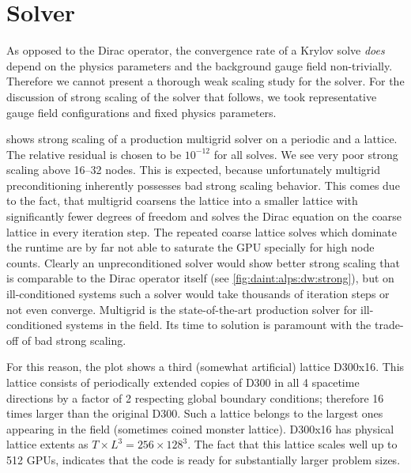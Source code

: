 
\section{Solver}
\label{sec:perf:solver}

As opposed to the Dirac operator, the convergence rate of a Krylov solve \emph{does} depend on the physics parameters and the background gauge field non-trivially.
Therefore we cannot present a thorough weak scaling study for the solver.
For the discussion of strong scaling of the solver that follows, we took representative gauge field configurations and fixed physics parameters.

 shows strong scaling of a production multigrid solver on a periodic and a \Cstar lattice.
The relative residual is chosen to be $10^{-12}$ for all solves.
We see very poor strong scaling above \numrange{16}{32} nodes.
This is expected, because unfortunately multigrid preconditioning inherently possesses bad strong scaling behavior.
This comes due to the fact, that multigrid coarsens the lattice into a smaller lattice with significantly fewer degrees of freedom and solves the Dirac equation on the coarse lattice in every iteration step.
The repeated coarse lattice solves which dominate the runtime are by far not able to saturate the GPU specially for high node counts.
Clearly an unpreconditioned solver would show better strong scaling that is comparable to the Dirac operator itself (see \cref{fig:daint:alps:dw:strong}), but on ill-conditioned systems such a solver would take thousands of iteration steps or not even converge.
Multigrid is the state-of-the-art production solver for ill-conditioned systems in the field.
Its time to solution is paramount with the trade-off of bad strong scaling.

For this reason, the plot shows a third (somewhat artificial) lattice D300x16.
This lattice consists of periodically extended copies of D300 in all \num{4} spacetime directions by a factor of \num{2} respecting global boundary conditions; therefore \num{16} times larger than the original D300.
Such a lattice belongs to the largest ones appearing in the field (sometimes coined monster lattice).
D300x16 has physical lattice extents as $T \times L^{3} = 256 \times 128^{3}$.
The fact that this lattice scales well up to \num{512} GPUs, indicates that the code is ready for substantially larger problem sizes.

